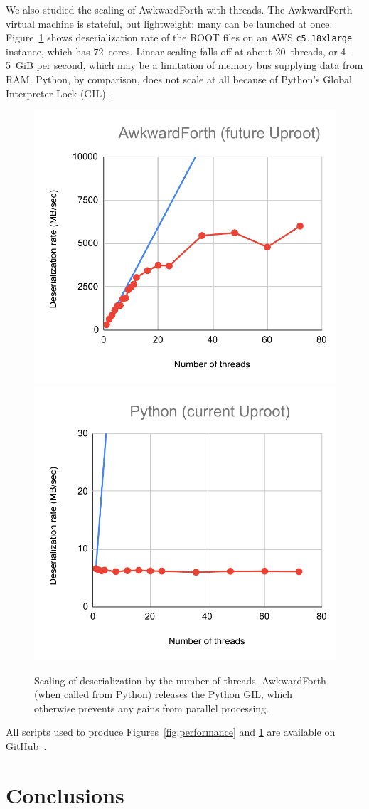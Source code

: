 \documentclass{webofc}
\begin{document}
We also studied the scaling of AwkwardForth with threads. The AwkwardForth virtual machine is stateful, but lightweight: many can be launched at once. Figure~\ref{fig:scaling} shows deserialization rate of the ROOT files on an AWS {\tt c5.18xlarge} instance, which has 72~cores. Linear scaling falls off at about 20~threads, or 4--5~GiB per second, which may be a limitation of memory bus supplying data from RAM. Python, by comparison, does not scale at all because of Python's Global Interpreter Lock (GIL)~\cite{python-gil}.

\begin{figure}[t]
\includegraphics[width=0.5\linewidth]{AwkwardForth-scaling.pdf}
\includegraphics[width=0.5\linewidth]{Python-scaling.pdf}

\caption{Scaling of deserialization by the number of threads. AwkwardForth (when called from Python) releases the Python GIL, which otherwise prevents any gains from parallel processing. \label{fig:scaling}}
\end{figure}

All scripts used to produce Figures~\ref{fig:performance} and \ref{fig:scaling} are available on GitHub~\cite{this-study}.

\section{Conclusions}
\end{document}
